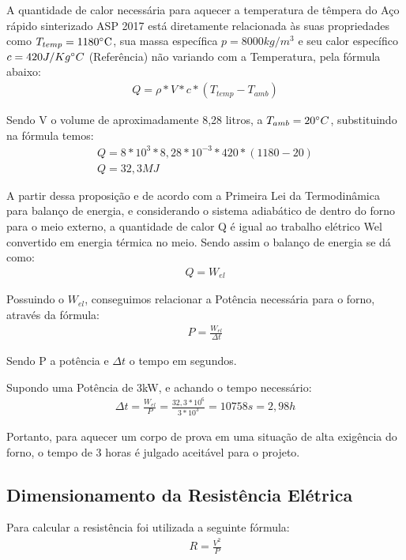 A quantidade de calor necessária para aquecer a temperatura de têmpera do Aço rápido sinterizado ASP 2017 está diretamente relacionada às suas propriedades como $T_{temp} = 1180 \degree \text{C}$, sua massa específica $p = 8000 kg/m^{3}$ e seu calor específico $c = 420 J/Kg \degree C$ (Referência) não variando com a Temperatura, pela fórmula abaixo:
\begin{gather}
	Q = \rho * V * c * (T_{temp} - T_{amb})
\end{gather}

Sendo V o volume de aproximadamente 8,28 litros, a $T_{amb}=20 \degree C$, substituindo na fórmula temos:
\begin{gather}
    Q = 8*10^{3}*8,28*10^{-3}*420*(1180-20) \nonumber \\
    Q = 32,3 MJ \nonumber
\end{gather}

A partir dessa proposição e de acordo com a Primeira Lei da Termodinâmica para balanço de energia, e considerando o sistema adiabático de dentro do forno para o meio externo, a quantidade de calor Q é igual ao trabalho elétrico Wel convertido em energia térmica no meio. Sendo assim o balanço de energia se dá como:
\begin{gather}
    Q = W_{el}
\end{gather}

Possuindo o $W_{el}$, conseguimos relacionar a Potência necessária para o forno, através da fórmula:
\begin{gather}
    P = \frac{W_{el}}{\Delta t}
\end{gather}

Sendo P a potência e $\Delta t$ o tempo em segundos.

Supondo uma Potência de 3kW, e achando o tempo necessário:
\begin{gather}
    \Delta t = \frac{W_{el}}{P} = \frac{32,3*10^6}{3*10^3} = 10758s = 2,98h \nonumber
\end{gather}

Portanto, para aquecer um corpo de prova em uma situação de alta exigência do forno, o tempo de 3 horas é julgado aceitável para o projeto.

\subsection{Dimensionamento da Resistência Elétrica}
Para calcular a resistência foi utilizada a seguinte fórmula:
\begin{gather}
    R = \frac{V^2}{P}
\end{gather}

